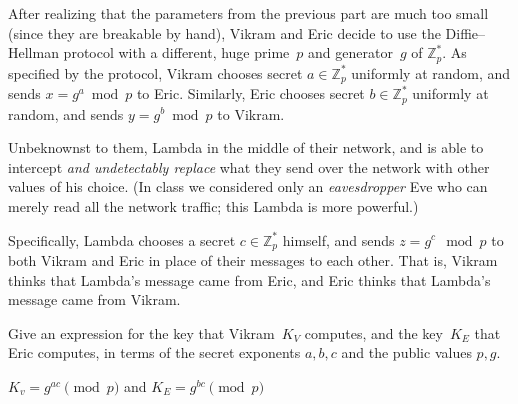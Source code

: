 \documentclass[12pt, letterpaper]{article}
\newcommand{\Z}{\mathbb{Z}}
\begin{document}
\begin{subproblem}{}
    After realizing that the parameters from the previous part are much too small (since they are breakable by hand), Vikram and Eric decide to use the Diffie--Hellman protocol with a different, huge prime~$p$ and generator~$g$ of $\Z_p^*$.
    As specified by the protocol, Vikram chooses secret $a \in \Z_p^*$ uniformly at random, and sends $x = g^a \bmod p$ to Eric.
    Similarly, Eric chooses secret $b \in \Z_p^*$ uniformly at random, and sends $y = g^b \bmod p$ to Vikram.

    Unbeknownst to them, Lambda in the middle of their network, and is able to intercept \emph{and undetectably replace} what they send over the network with other values of his choice.
    (In class we considered only an \emph{eavesdropper} Eve who can merely read all the network traffic; this Lambda is more powerful.)
    
    Specifically, Lambda chooses a secret $c \in \Z_p^*$ himself, and sends $z = g^c \mod p$ to both Vikram and Eric in place of their messages to each other.
    That is, Vikram thinks that Lambda's message came from Eric, and Eric thinks that Lambda's message came from Vikram.

    Give an expression for the key that Vikram~$K_V$ computes, and the key~$K_E$ that Eric computes, in terms of the secret exponents $a,b,c$ and the public values $p,g$.
\end{subproblem}
\begin{problemproof}
    $K_v=g^{ac} \pmod{p}$ and $K_E=g^{bc} \pmod{p}$
\end{problemproof}
\end{document}
